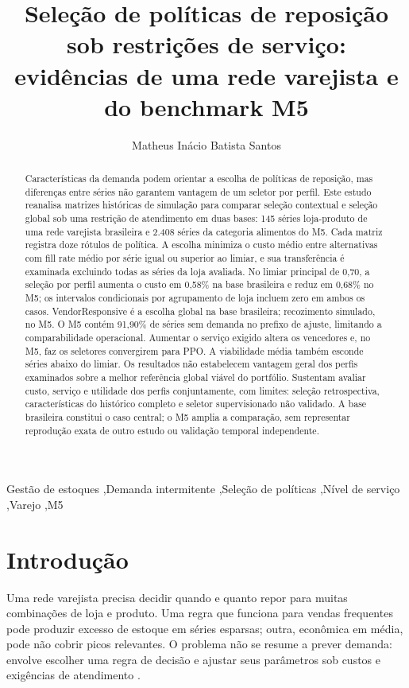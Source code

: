 \documentclass[preprint,12pt]{elsarticle}
\begin{document}
\begin{frontmatter}
\title{Seleção de políticas de reposição sob restrições de serviço: evidências de uma rede varejista e do benchmark M5}
\author[ufal]{Matheus Inácio Batista Santos}
\begin{abstract}
Características da demanda podem orientar a escolha de políticas de reposição, mas diferenças entre séries não garantem vantagem de um seletor por perfil. Este estudo reanalisa matrizes históricas de simulação para comparar seleção contextual e seleção global sob uma restrição de atendimento em duas bases: 145 séries loja-produto de uma rede varejista brasileira e 2.408 séries da categoria alimentos do M5. Cada matriz registra doze rótulos de política. A escolha minimiza o custo médio entre alternativas com fill rate médio por série igual ou superior ao limiar, e sua transferência é examinada excluindo todas as séries da loja avaliada. No limiar principal de 0,70, a seleção por perfil aumenta o custo em 0,58\% na base brasileira e reduz em 0,68\% no M5; os intervalos condicionais por agrupamento de loja incluem zero em ambos os casos. VendorResponsive é a escolha global na base brasileira; recozimento simulado, no M5. O M5 contém 91,90\% de séries sem demanda no prefixo de ajuste, limitando a comparabilidade operacional. Aumentar o serviço exigido altera os vencedores e, no M5, faz os seletores convergirem para PPO. A viabilidade média também esconde séries abaixo do limiar. Os resultados não estabelecem vantagem geral dos perfis examinados sobre a melhor referência global viável do portfólio. Sustentam avaliar custo, serviço e utilidade dos perfis conjuntamente, com limites: seleção retrospectiva, características do histórico completo e seletor supervisionado não validado. A base brasileira constitui o caso central; o M5 amplia a comparação, sem representar reprodução exata de outro estudo ou validação temporal independente.
\end{abstract}
\begin{keyword}
Gestão de estoques \sep Demanda intermitente \sep Seleção de políticas \sep Nível de serviço \sep Varejo \sep M5
\end{keyword}
\end{frontmatter}

\section{Introdução}
Uma rede varejista precisa decidir quando e quanto repor para muitas combinações de loja e produto. Uma regra que funciona para vendas frequentes pode produzir excesso de estoque em séries esparsas; outra, econômica em média, pode não cobrir picos relevantes. O problema não se resume a prever demanda: envolve escolher uma regra de decisão e ajustar seus parâmetros sob custos e exigências de atendimento \cite{Axsater2006InventoryControl}.
\end{document}

